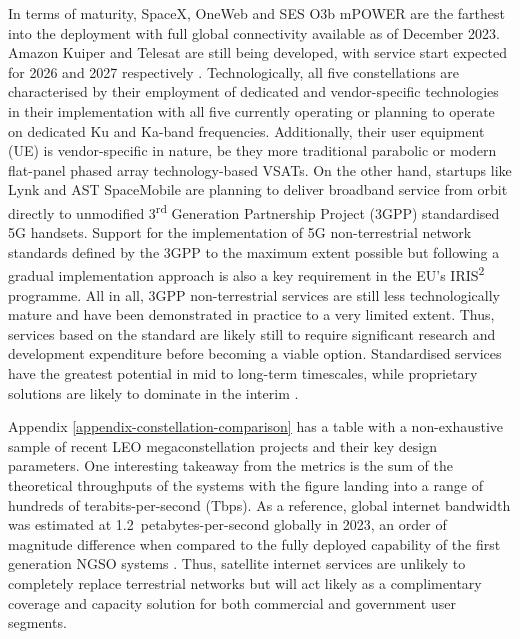 \documentclass[english, 12pt, a4paper, elec, utf8, a-1b, online]{aaltothesis}
\begin{document}
In terms of maturity, SpaceX, OneWeb and SES O3b mPOWER are the farthest into the deployment with full global connectivity available as of December 2023.
Amazon Kuiper and Telesat are still being developed, with service start expected for 2026 and 2027 respectively \cite{euspa-secure-satcom-2023,euroconsult-ngso-tracker-2023-q3}.
Technologically, all five constellations are characterised by their employment of dedicated and vendor-specific technologies in their implementation with all five currently operating or planning to operate on dedicated Ku and Ka-band frequencies.
Additionally, their user equipment (UE) is vendor-specific in nature, be they more traditional parabolic or modern flat-panel phased array technology-based VSATs.
On the other hand, startups like Lynk and AST SpaceMobile are planning to deliver broadband service from orbit directly to unmodified 3\textsuperscript{rd} Generation Partnership Project (3GPP) standardised 5G handsets.
Support for the implementation of 5G non-terrestrial network standards defined by the 3GPP to the maximum extent possible but following a gradual implementation approach is also a key requirement in the EU's IRIS\textsuperscript{2} programme.
All in all, 3GPP non-terrestrial services are still less technologically mature and have been demonstrated in practice to a very limited extent.
Thus, services based on the standard are likely still to require significant research and development expenditure before becoming a viable option.
Standardised services have the greatest potential in mid to long-term timescales, while proprietary solutions are likely to dominate in the interim \cite{iris2-industryday-2023-03, nsr-5g-via-satellite-2023, nsr-direct-to-device-market-2023}.

Appendix \ref{appendix-constellation-comparison} has a table with a non-exhaustive sample of recent LEO megaconstellation projects and their key design parameters.
One interesting takeaway from the metrics is the sum of the theoretical throughputs of the systems with the figure landing into a range of hundreds of terabits-per-second (Tbps).
As a reference, global internet bandwidth was estimated at 1.2~petabytes-per-second globally in 2023, an order of magnitude difference when compared to the fully deployed capability of the first generation NGSO systems \cite{telegeography-ip-networks-2023}.
Thus, satellite internet services are unlikely to completely replace terrestrial networks but will act likely as a complimentary coverage and capacity solution for both commercial and government user segments.
\end{document}
